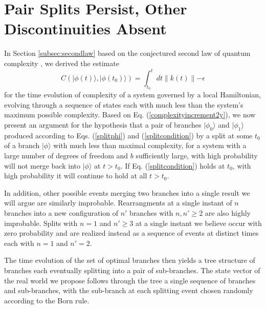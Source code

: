 \documentclass[12pt,amsmath,amssymb,onecolumn]{revtex4-2}
\begin{document}
\section{\label{sec:secondlaw} Pair Splits Persist, Other Discontinuities Absent}

In Section \ref{subsec:secondlaw}
based on the conjectured second law of quantum
complexity \cite{Susskind}, we derived the estimate
\begin{equation}
  \label{complexityincrement2y}
  C( |\phi(t) \rangle , |\phi(t_0) \rangle ) = \int_{t_0}^t dt \parallel k(t) \parallel - \epsilon
\end{equation}
for the time evolution of complexity of a system
governed by a local Hamiltonian,
evolving through a sequence of states
each with much less than
the system's maximum possible complexity.
Based on Eq. (\ref{complexityincrement2y}),
we now present an argument for the hypothesis that
a pair of branches $|\phi_0 \rangle $ and $|\phi_1 \rangle $
produced according to Eqs. (\ref{splitphi})
and (\ref{splitcondition}) by
a split  at some $t_0$ of a branch $|\phi \rangle $ with much less than maximal complexity,
for a system with a large number of degrees of freedom and $b$ sufficiently large,
with high probability will not merge back
into $|\phi \rangle $
at $t > t_0$.
If Eq. (\ref{splitcondition})
holds at $t_0$, with high probability it will 
continue to hold
at all
$t > t_0$.

In addition, 
other possible events merging two branches
into a single result 
we will argue are similarly improbable.
Rearrangments at a single instant of $n$ branches into
a new configuration of $n'$ branches with $n, n' \ge 2$
are also highly improbable.
Splits with $n = 1$ and $n' \ge 3$ at a single instant
we believe occur with zero probability and
are realized instead as a sequence of events at distinct times
each with $n = 1$ and $n' = 2$.

The time evolution of the set of optimal branches then
yields a tree structure of branches each eventually splitting
into a pair of sub-branches.  The state vector of the real world
we propose follows through the tree a single sequence of
branches and sub-branches, with the sub-branch at each splitting
event chosen randomly according to the Born rule.
\end{document}
